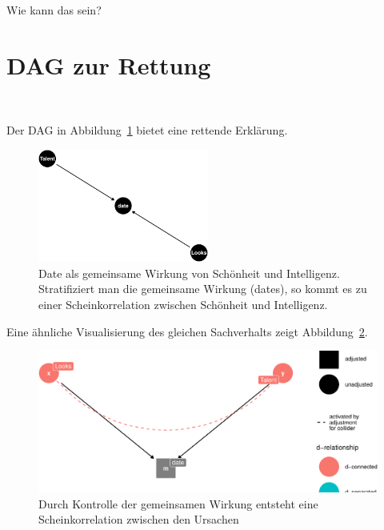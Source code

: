 \documentclass[
  a4paper,
  DIV=11]{scrreprt}
\theoremstyle{definition}
\theoremstyle{remark}
\begin{document}
Wie kann das sein?

\hypertarget{dag-zur-rettung}{%
\section{DAG zur Rettung}\label{dag-zur-rettung}}

🦹 🦸

Der DAG in Abbildung~\ref{fig-coll1-dag} bietet eine rettende Erklärung.

\begin{figure}

{\centering \includegraphics[width=0.5\textwidth,height=\textheight]{./kausal_files/figure-pdf/fig-coll1-dag-1.pdf}

}

\caption{\label{fig-coll1-dag}Date als gemeinsame Wirkung von Schönheit
und Intelligenz. Stratifiziert man die gemeinsame Wirkung (dates), so
kommt es zu einer Scheinkorrelation zwischen Schönheit und Intelligenz.}

\end{figure}

Eine ähnliche Visualisierung des gleichen Sachverhalts zeigt
Abbildung~\ref{fig-coll2-dag}.

\begin{figure}

{\centering \includegraphics{./kausal_files/figure-pdf/fig-coll2-dag-1.pdf}

}

\caption{\label{fig-coll2-dag}Durch Kontrolle der gemeinsamen Wirkung
entsteht eine Scheinkorrelation zwischen den Ursachen}

\end{figure}
\end{document}
